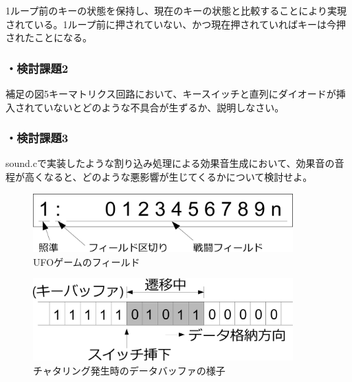 ﻿\documentclass{jarticle}
\begin{document}
1ループ前のキーの状態を保持し、現在のキーの状態と比較することにより実現されている。1ループ前に押されていない、かつ現在押されていればキーは今押されたことになる。
\subsubsection*{・検討課題2}
補足の図5キーマトリクス回路において、キースイッチと直列にダイオードが挿入されていないとどのような不具合が生ずるか、説明しなさい。



\subsubsection*{・検討課題3}
sound.cで実装したような割り込み処理による効果音生成において、効果音の音程が高くなると、どのような悪影響が生じてくるかについて検討せよ。

\newpage

\begin{figure}{}
	\begin{center}
		\includegraphics[width=10cm]{./figure1.eps}
	\end{center}
	\caption{UFOゲームのフィールド}
\end{figure}

\begin{figure}{}
	\begin{center}
		\includegraphics[width=10cm]{./figure2.eps}
	\end{center}
	\caption{チャタリング発生時のデータバッファの様子}
\end{figure}
\end{document}

